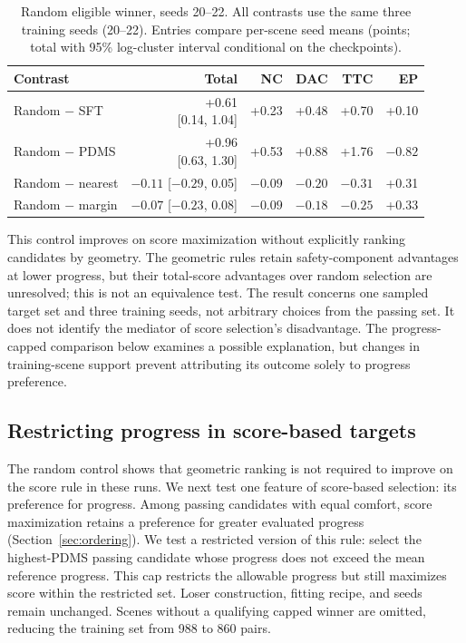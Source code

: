\documentclass[letterpaper,10pt,conference]{ieeeconf}
\begin{document}
\begin{table}[t]
\centering\small
\caption{Random eligible winner, seeds 20--22. All contrasts use the same three training seeds (20--22). Entries compare per-scene seed means (points; total with 95\% log-cluster interval conditional on the checkpoints).}
\label{tab:randwin}
\renewcommand{\arraystretch}{1.18}
\setlength{\tabcolsep}{3pt}
\begin{tabular}{@{}lrrrrr@{}}
\toprule
Contrast & Total & NC & DAC & TTC & EP \\
\midrule
Random $-$ SFT & \shortstack{+0.61\\{}[0.14, 1.04]} & +0.23 & +0.48 & +0.70 & +0.10 \\
Random $-$ PDMS & \shortstack{+0.96\\{}[0.63, 1.30]} & +0.53 & +0.88 & +1.76 & $-0.82$ \\
Random $-$ nearest & \shortstack{$-0.11$\\{}[$-0.29$, 0.05]} & $-0.09$ & $-0.20$ & $-0.31$ & +0.31 \\
Random $-$ margin & \shortstack{$-0.07$\\{}[$-0.23$, 0.08]} & $-0.09$ & $-0.18$ & $-0.25$ & +0.33 \\
\bottomrule
\end{tabular}
\end{table}

This control improves on score maximization without explicitly ranking candidates by geometry. The geometric rules retain safety-component advantages at lower progress, but their total-score advantages over random selection are unresolved; this is not an equivalence test. The result concerns one sampled target set and three training seeds, not arbitrary choices from the passing set. It does not identify the mediator of score selection's disadvantage. The progress-capped comparison below examines a possible explanation, but changes in training-scene support prevent attributing its outcome solely to progress preference.

\subsection{Restricting progress in score-based targets}\label{sec:capped}
The random control shows that geometric ranking is not required to improve on the score rule in these runs. We next test one feature of score-based selection: its preference for progress. Among passing candidates with equal comfort, score maximization retains a preference for greater evaluated progress (Section~\ref{sec:ordering}). We test a restricted version of this rule: select the highest-PDMS passing candidate whose progress does not exceed the mean reference progress. This cap restricts the allowable progress but still maximizes score within the restricted set. Loser construction, fitting recipe, and seeds remain unchanged. Scenes without a qualifying capped winner are omitted, reducing the training set from 988 to 860 pairs.
\end{document}
